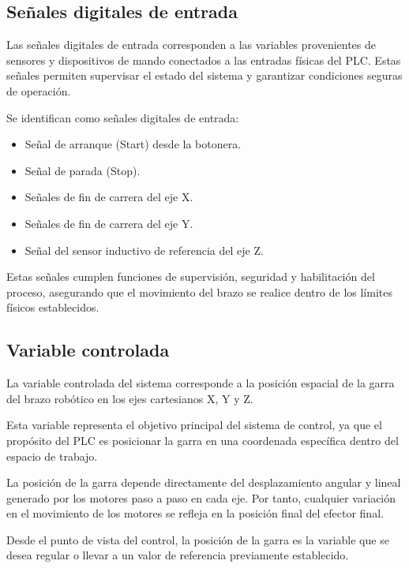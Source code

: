 \documentclass[a4paper,12pt]{article}
\begin{document}
\subsection*{Señales digitales de entrada}

Las señales digitales de entrada corresponden a las variables provenientes de sensores y dispositivos de mando conectados a las entradas físicas del PLC. Estas señales permiten supervisar el estado del sistema y garantizar condiciones seguras de operación.

Se identifican como señales digitales de entrada:

\begin{itemize}
    \item Señal de arranque (Start) desde la botonera.
    \item Señal de parada (Stop).
    \item Señales de fin de carrera del eje X.
    \item Señales de fin de carrera del eje Y.
    \item Señal del sensor inductivo de referencia del eje Z.
\end{itemize}

Estas señales cumplen funciones de supervisión, seguridad y habilitación del proceso, asegurando que el movimiento del brazo se realice dentro de los límites físicos establecidos.




\subsection{Variable controlada}

La variable controlada del sistema corresponde a la posición espacial de la garra del brazo robótico en los ejes cartesianos X, Y y Z. 

Esta variable representa el objetivo principal del sistema de control, ya que el propósito del PLC es posicionar la garra en una coordenada específica dentro del espacio de trabajo.

La posición de la garra depende directamente del desplazamiento angular y lineal generado por los motores paso a paso en cada eje. Por tanto, cualquier variación en el movimiento de los motores se refleja en la posición final del efector final.

Desde el punto de vista del control, la posición de la garra es la variable que se desea regular o llevar a un valor de referencia previamente establecido.
\end{document}
